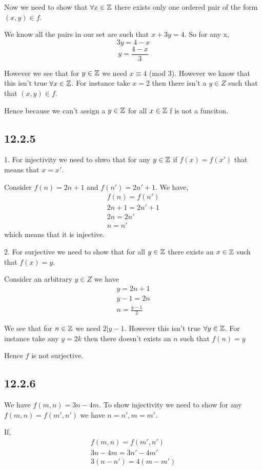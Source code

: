\documentclass[a4paper]{report}
\begin{document}
Now we need to show that $\forall x \in \mathbb{Z}$ there exists only one ordered pair of the form  $(x,y) \in f$.

We know all the pairs in our set are such that $x + 3y = 4$. So for any x,  
$$ 3y = 4 - x $$ 
$$ y = \frac{4-x}{3} $$

However we see that for $y \in \mathbb{Z}$ we need $x \equiv 4$ (mod 3). However we know that this isn't true  $\forall x \in \mathbb{Z}$. For instance take  $x = 2$ then  there isn't a $y \in Z$ such that that $(x,y) \in f$.

Hence because we can't assign a  $y \in \mathbb{Z}$ for all $x \in \mathbb{Z}$ f is not a funciton.



\subsection*{12.2.5}
1. For injectivity we need to shwo that for any $y \in \mathbb{Z}$ if $f(x) =f(x')$ that means that $x = x'$.

Consider  $f(n) = 2n + 1$ and  $f(n') = 2n' + 1$. We have, 
\begin{align*}
    f(n) = f(n')\\
    2n + 1 = 2n' + 1\\
    2n = 2n'\\
    n = n'
\end{align*}
which means that it is injective.


2. For surjective we need to show that for all $y \in \mathbb{Z}$ there exists an $x \in \mathbb{Z}$ such that $f(x) = y$.

Consider an arbitrary  $y \in Z$ we have 
\begin{align*}
   y = 2n + 1\\
   y - 1 = 2n\\
   n = \frac{y - 1}{2}
\end{align*}

We see that for  $n \in \mathbb{Z}$ we need $2 | y-1$. However this isn't true  $\forall y \in \mathbb{Z}$. For instance take any $y = 2k$ then there doesn't exists an $n$ such that $f(n) = y$

Hence  $f$ is not surjective.


\subsection*{12.2.6}
We have $f(m,n) = 3n - 4m$. To show injectivity we need to show for any  $f(m,n) = f(m',n')$ we have $n = n', m = m'$.

If, 
\begin{align*}
   f(m,n) = f(m',n')\\
   3n -4m = 3n' - 4m'\\
   3(n - n') = 4(m - m')
\end{align*}
\end{document}
